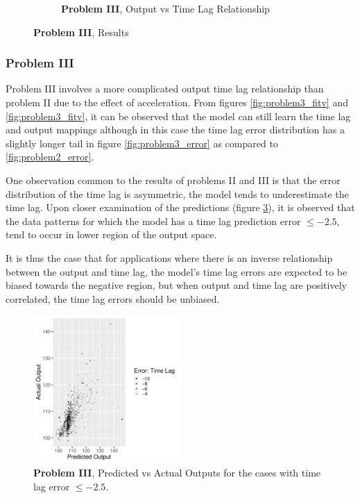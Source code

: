 \documentclass[envcountsect,runningheads]{llncs}
\theoremstyle{etoile}
\begin{document}
\begin{figure}
\begin{subfigure}[b]{0.4\textwidth}
    \caption{ \textbf{Problem III}, Output vs Time Lag Relationship} 
    \label{fig:problem3_curves}
  \end{subfigure}
  
  \caption{\textbf{Problem III}, Results}
\end{figure}


\subsubsection{Problem III}

Problem III involves a more complicated output time lag relationship than problem II due to the 
effect of acceleration. From figures \ref{fig:problem3_fitv} and \ref{fig:problem3_fitv}, 
it can be observed that the model can still learn the time lag and output mappings although 
in this case the time lag error distribution has a slightly longer tail in figure 
\ref{fig:problem3_error} as compared to \ref{fig:problem2_error}.

One observation common to the results of problems II and III is that the error distribution of 
the time lag is asymmetric, the model tends to underestimate the time lag. Upon closer examination 
of the predictions (figure \ref{fig:problem3_lag_error_jus}), it is observed that the data patterns 
for which the model has a time lag prediction error $\leq -2.5$, tend to occur in lower region of 
the output space. %

It is thus the case that for applications where there is an inverse relationship between the output 
and time lag, the model's time lag errors are expected to be biased towards the negative region, 
but when output and time lag are positively correlated, the time lag errors should be unbiased.

\begin{figure}[h]
\vspace{.3in}
\centerline{\includegraphics[width=0.5\textwidth]{figures/exp3_lag_error_jus}}
\vspace{.3in}
\caption{\textbf{Problem III}, Predicted vs Actual Outputs for the cases with time lag error $\leq -2.5$.}
\label{fig:problem3_lag_error_jus}
\end{figure}
\end{document}
